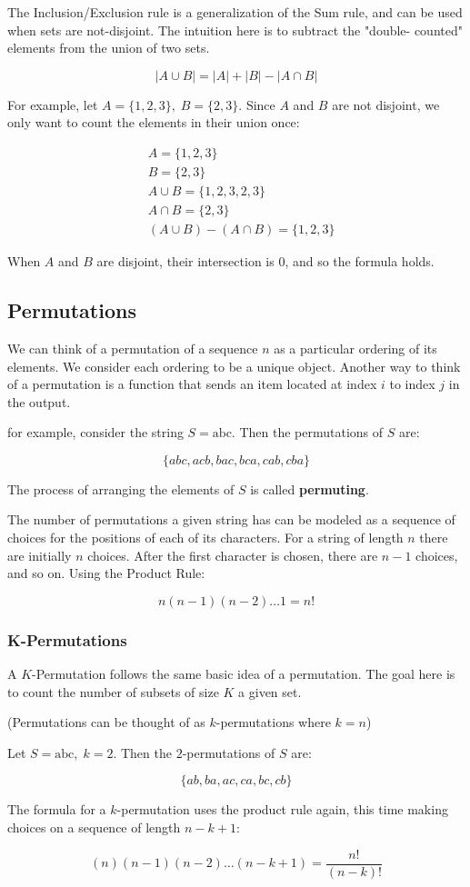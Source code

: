 \documentclass{standlone}
\begin{document}
The Inclusion/Exclusion rule is a generalization of the Sum rule, and can be
used when sets are not-disjoint. The intuition here is to subtract the "double-
counted" elements from the union of two sets.

\[
  |A \cup B| = |A| + |B| - |A \cap B|
\]

For example, let $A = \{1, 2, 3\}, \; B = \{2, 3\}$. Since $A$ and $B$ are not
disjoint, we only want to count the elements in their union once:

\begin{align*}
  &A = \{1, 2, 3\} \\
  &B = \{2, 3\} \\
  &A \cup B = \{1, 2, 3, 2, 3\} \\
  &A \cap B = \{2, 3\} \\
  &(A \cup B) - (A \cap B) = \{1, 2, 3\}
\end{align*}

When $A$ and $B$ are disjoint, their intersection is $0$, and so the formula
holds.

\subsection{Permutations}

We can think of a permutation of a sequence $n$ as a particular ordering of
its elements. We consider each ordering to be a unique object. Another way to
think of a permutation is a function that sends an item located at index $i$ to
index $j$ in the output.

for example, consider the string $S = \text{abc}$. Then the permutations of $S$
are:

\[
  \{ abc, acb, bac, bca, cab, cba \}
\]

The process of arranging the elements of $S$ is called \textbf{permuting}.

The number of permutations a given string has can be modeled as a sequence of
choices for the positions of each of its characters. For a string of length $n$
there are initially $n$ choices. After the first character is chosen, there are
$n-1$ choices, and so on. Using the Product Rule:

\[
  n(n-1)(n-2) \dots 1 = n!
\]

\subsubsection{K-Permutations}

A $K$-Permutation follows the same basic idea of a permutation. The goal here
is to count the number of subsets of size $K$ a given set.

(Permutations can be thought of as $k$-permutations where $k=n$)

Let $S = \text{abc}, \; k = 2$. Then the $2$-permutations of $S$ are:

\[
  \{ ab, ba, ac, ca, bc, cb \}
\]

The formula for a $k$-permutation uses the product rule again, this time making
choices on a sequence of length $n-k+1$:

\[
  (n)(n-1)(n-2)\dots(n-k+1) = \frac {n!} {(n-k)!}
\]
\end{document}
